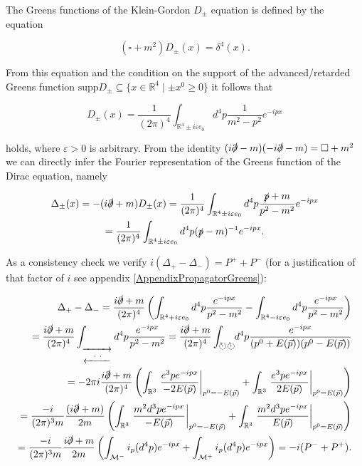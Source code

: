 \documentclass[a4paper,11pt]{article}
\begin{document}
The Greens functions of the Klein-Gordon \(D_\pm\) equation is defined by the equation

\begin{equation}
(\square +m^2) D_\pm (x)=\delta^4(x).
\end{equation}

From this equation and the condition on the support of the advanced/retarded Greens function \(\text{supp} D_\pm \subseteq \{x\in \mathbb{R}^4\mid  \pm x^0\ge 0\}\) it follows that 

\begin{equation}
D_\pm (x)= \frac{1}{(2\pi)^4} \int_{\mathbb{R}^4\pm i \varepsilon e_0}d^4p \frac{1}{m^2-p^2} e^{-i p x}
\end{equation}

holds, where \(\varepsilon>0\) is arbitrary. From the identity \((i\slashed{\partial} -m)(-i \slashed{\partial} -m)=\square +m^2\) we can directly
infer the Fourier representation of the Greens function of the Dirac equation, namely

\begin{multline}
\Delta_\pm (x)= -(i\slashed{\partial} +m) D_\pm (x)
=\frac{1}{(2\pi)^4} \int_{\mathbb{R}^4 \pm i \varepsilon e_0}d^4p \frac{\slashed{p}+m}{p^2-m^2}e^{-i p x}\\
=\frac{1}{(2\pi)^4} \int_{\mathbb{R}^4 \pm i \varepsilon e_0}d^4p (\slashed{p}-m)^{-1}e^{-i p x}.
\end{multline}

As a consistency check we verify \(i (\Delta_+-\Delta_-)=P^++P^-\) (for a justification of that factor of \(i\) 
see appendix \ref{AppendixPropagatorGreens}):

\begin{align}
\Delta_+-\Delta_-=\frac{i\slashed{\partial} +m}{(2\pi)^4}\left(\int_{\mathbb{R}^4+i\varepsilon e_0}d^4p \frac{e^{-ipx}}{p^2-m^2} -\int_{\mathbb{R}^4-i\varepsilon e_0}d^4p \frac{e^{-ipx}}{p^2-m^2} \right)\\
=\frac{i\slashed{\partial} +m}{(2\pi)^4} \int_{\raisebox{-15pt}{$\overset{\xrightarrow{~~~~~~~}}{\xleftarrow{~~\cdot~\cdot~~}}$}}d^4 p \frac{e^{-ipx}}{p^2-m^2}
=\frac{i\slashed{\partial} +m}{(2\pi)^4} \int_{\mathlarger{\circlearrowright} \!\!\!\!\raisebox{0.3pt}{$\cdot$}~\mathlarger{\circlearrowright} \!\!\!\!\raisebox{0.3pt}{$\cdot$}} d^4 p \frac{e^{-ipx}}{(p^0+E(\vec{p}))(p^0-E(\vec{p}))}\\
=-2\pi i \frac{i\slashed{\partial} +m}{(2\pi)^4}\left( \int_{\mathbb{R}^3}\left. \frac{e^3p e^{-ipx}}{-2E(\vec{p})}\right|_{p^0=-E(\vec{p})} +\int_{\mathbb{R}^3}\left. \frac{e^3 p e^{-ipx}}{2E(\vec{p})}\right|_{p^0=E(\vec{p})} \right)\\
=\frac{-i}{(2\pi)^3m} \frac{(i \slashed{\partial}+m)}{2m}\left(\int_{\mathbb{R}^3} \left.\frac{m^2 d^3 p  e^{-ipx}}{-E(\vec{p})}\right|_{p^0=-E(\vec{p})}+\int_{\mathbb{R}^3} \left.\frac{m^2 d^3 p e^{-ipx}}{E(\vec{p})}\right|_{p^0=E(\vec{p})}\right)\\
=\frac{-i}{(2\pi)^3m} \frac{i \slashed{\partial}+m}{2m} \left( \int_{\mathcal{M}^-}i_p(d^4p) e^{-ipx} + \int_{\mathcal{M}^+}i_p(d^4p) e^{-ipx}\right)=-i (P^-+P^+).
\end{align}
\end{document}
